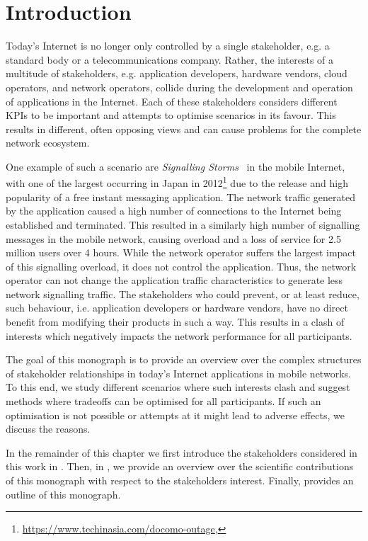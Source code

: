 \chapter{Introduction}\label{chap:introduction}

Today's Internet is no longer only controlled by a single stakeholder, e.g. a standard body or a telecommunications company.
Rather, the interests of a multitude of stakeholders, e.g. application developers, hardware vendors, cloud operators, and network operators, collide during the development and operation of applications in the Internet.
Each of these stakeholders considers different \glspl{KPI} to be important and attempts to optimise scenarios in its favour.
This results in different, often opposing views and can cause problems for the complete network ecosystem.

One example of such a scenario are \emph{Signalling Storms}~\cite{Huawei2011} in the mobile Internet, with one of the largest occurring in Japan in 2012\footnote{\url{https://www.techinasia.com/docomo-outage}, \accessed} due to the release and high popularity of a free instant messaging application.
The network traffic generated by the application caused a high number of connections to the Internet being established and terminated.
This resulted in a similarly high number of signalling messages in the mobile network, causing overload and a loss of service for 2.5 million users over 4 hours.
While the network operator suffers the largest impact of this signalling overload, it does not control the application.
Thus, the network operator can not change the application traffic characteristics to generate less network signalling traffic.
The stakeholders who could prevent, or at least reduce, such behaviour, i.e. application developers or hardware vendors, have no direct benefit from modifying their products in such a way.
This results in a clash of interests which negatively impacts the network performance for all participants.

The goal of this monograph is to provide an overview over the complex structures of stakeholder relationships in today's Internet applications in mobile networks.
To this end, we study different scenarios where such interests clash and suggest methods where tradeoffs can be optimised for all participants.
If such an optimisation is not possible or attempts at it might lead to adverse effects, we discuss the reasons.

In the remainder of this chapter we first introduce the stakeholders considered in this work in .
Then, in , we provide an overview over the scientific contributions of this monograph with respect to the stakeholders interest.
Finally,  provides an outline of this monograph.

